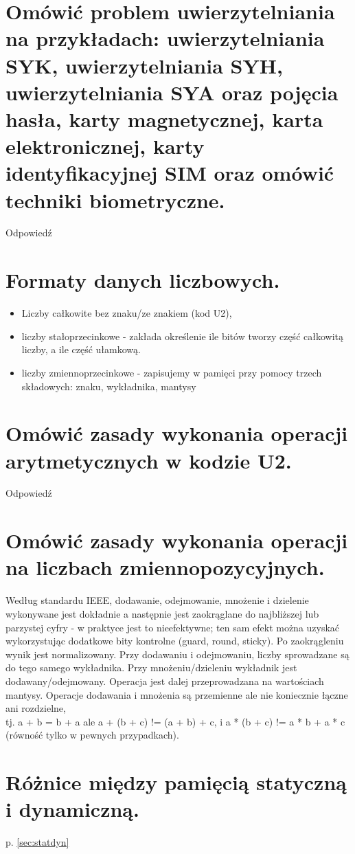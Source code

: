 \documentclass[12pt,a4paper]{article}
\begin{document}
	\section{Omówić problem uwierzytelniania na przykładach: uwierzytelniania SYK, uwierzytelniania SYH, uwierzytelniania SYA oraz pojęcia hasła, karty magnetycznej, karta elektronicznej, karty identyfikacyjnej SIM oraz omówić techniki biometryczne.}
	Odpowiedź

	\section{Formaty danych liczbowych.}
	\begin{itemize}
		\item Liczby całkowite bez znaku/ze znakiem (kod U2), 
		\item liczby stałoprzecinkowe - zakłada określenie ile bitów tworzy część całkowitą liczby, a ile część ułamkową. 
		\item liczby zmiennoprzecinkowe - zapisujemy w pamięci przy pomocy trzech składowych: znaku, wykładnika, mantysy
	\end{itemize}

	\section{Omówić zasady wykonania operacji arytmetycznych w kodzie U2.}
	Odpowiedź

	\section{Omówić zasady wykonania operacji na liczbach zmiennopozycyjnych.}
	Według standardu IEEE, dodawanie, odejmowanie, mnożenie i dzielenie wykonywane jest dokładnie a następnie jest zaokrąglane do najbliższej lub parzystej cyfry - w praktyce jest to nieefektywne; ten sam efekt można uzyskać wykorzystując dodatkowe bity kontrolne (guard, round, sticky). Po zaokrągleniu wynik jest normalizowany. Przy dodawaniu i odejmowaniu, liczby sprowadzane są do tego samego wykładnika. Przy mnożeniu/dzieleniu wykładnik jest dodawany/odejmowany. Operacja jest dalej przeprowadzana na wartościach mantysy. Operacje dodawania i mnożenia są przemienne ale nie koniecznie łączne ani rozdzielne,\\tj. a + b = b + a ale a + (b + c) != (a + b) + c, i a * (b + c) != a * b + a * c (równość tylko w pewnych przypadkach).

	\section{Różnice między pamięcią statyczną i dynamiczną.}
	p. \ref{sec:statdyn}
\end{document}
